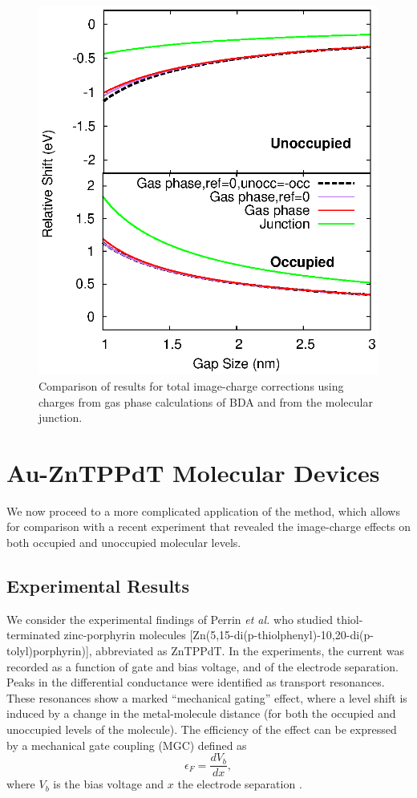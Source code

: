 \documentclass[aip,jcp,a4paper,reprint,floatfix,superscriptaddress]{revtex4-1}
\newcommand{\etal}{\emph{et al.}\xspace}
\begin{document}
\begin{figure}
\includegraphics[width=.8\columnwidth]{Us_vs_Mowbraygas_BDA-ref}
\caption{Comparison of results for total image-charge corrections using charges from gas phase calculations of BDA and from the molecular junction.} \label{fg:gas_vs_junction_BDA}
\end{figure}




\section{Au-ZnTPPdT Molecular Devices} \label{Sec:ZnTPP}

We now proceed to a more complicated application of the method, which allows for comparison with a recent experiment that revealed the image-charge effects on both occupied and unoccupied molecular levels.


\subsection{Experimental Results}\label{experiments}

We consider the experimental findings of Perrin \etal\cite{Perrin2011a,Perrin2011b,Perrin2013} who studied thiol-terminated zinc-porphyrin molecules [Zn(5,15-di(p-thiolphenyl)-10,20-di(p-tolyl)porphyrin)], abbreviated as ZnTPPdT. 
In the experiments, the current was recorded as a function of gate and bias voltage, and of the electrode separation.
Peaks in the differential conductance were identified as transport resonances.
These resonances show a marked ``mechanical gating'' effect, where a level shift is induced by a change in the metal-molecule distance (for both the occupied and unoccupied levels of the molecule). The efficiency of the effect can be expressed by a mechanical gate coupling (MGC) defined as 
\begin{equation}
\epsilon_F=\frac{d V_b}{dx}, 
\end{equation}
where $V_b$ is the bias voltage and $x$ the electrode separation . 
\end{document}
